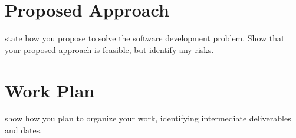 \documentclass{mprop}
\begin{document}
\newpage

\section{Proposed Approach}

state how you propose to solve the software development problem. Show that your proposed approach is feasible, but identify any risks.

\newpage

\section{Work Plan}

show how you plan to organize your work, identifying intermediate deliverables and dates.

\newpage



\end{document}
